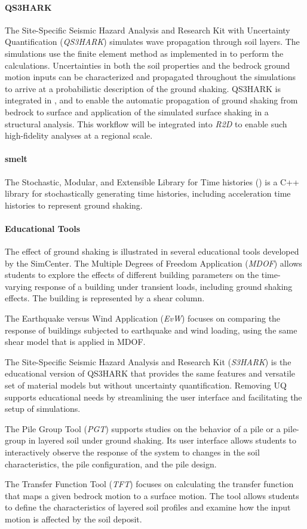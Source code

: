 \paragraph{QS3HARK} The Site-Specific Seismic Hazard Analysis and Research Kit with Uncertainty Quantification (\emph{QS3HARK}) simulates wave propagation through soil layers. The simulations use the finite element method as implemented in  to perform the calculations. Uncertainties in both the soil properties and the bedrock ground motion inputs can be characterized and propagated throughout the simulations to arrive at a probabilistic description of the ground shaking. QS3HARK is integrated in , and  to enable the automatic propagation of ground shaking from bedrock to surface and application of the simulated surface shaking in a structural analysis. This workflow will be integrated into \emph{R2D} to enable such high-fidelity analyses at a regional scale.

\paragraph{smelt} The Stochastic, Modular, and Extensible Library for Time histories () is a C++ library for stochastically generating time histories, including acceleration time histories to represent ground shaking.

\paragraph{Educational Tools}
The effect of ground shaking is illustrated in several educational tools developed by the SimCenter. The Multiple Degrees of Freedom Application (\emph{MDOF}) allows students to explore the effects of different building parameters on the time-varying response of a building under transient loads, including ground shaking effects. The building is represented by a shear column. 

\noindent The Earthquake versus Wind Application (\emph{EvW}) focuses on comparing the response of buildings subjected to earthquake and wind loading, using the same shear model that is applied in MDOF.

\noindent The Site-Specific Seismic Hazard Analysis and Research Kit (\emph{S3HARK}) is the educational version of QS3HARK that provides the same features and versatile set of material models but without uncertainty quantification. Removing UQ supports educational needs by streamlining the user interface and facilitating the setup of simulations.

\noindent The Pile Group Tool (\emph{PGT}) supports studies on the behavior of a pile or a pile-group in layered soil under ground shaking. Its user interface allows students to interactively observe the response of the system to changes in the soil characteristics, the pile configuration, and the pile design.

\noindent The Transfer Function Tool (\emph{TFT}) focuses on calculating the transfer function that maps a given bedrock motion to a surface motion. The tool allows students to define the characteristics of layered soil profiles and examine how the input motion is affected by the soil deposit.

